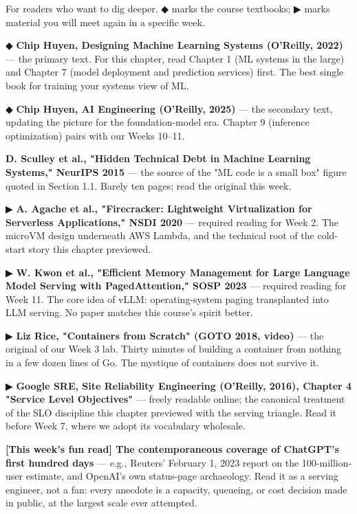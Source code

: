 For readers who want to dig deeper. ◆ marks the course textbooks; ▶ marks material you will meet again in a specific week.

\begin{tbbitemize}
  \item ◆ \textbf{Chip Huyen, Designing Machine Learning Systems (O'Reilly, 2022)} — the primary text. For this chapter, read Chapter 1 (ML systems in the large) and Chapter 7 (model deployment and prediction services) first. The best single book for training your systems view of ML.
  \item ◆ \textbf{Chip Huyen, AI Engineering (O'Reilly, 2025)} — the secondary text, updating the picture for the foundation-model era. Chapter 9 (inference optimization) pairs with our Weeks 10–11.
  \item \textbf{D. Sculley et al., "Hidden Technical Debt in Machine Learning Systems," NeurIPS 2015} — the source of the "ML code is a small box" figure quoted in Section 1.1. Barely ten pages; read the original this week.
  \item ▶ \textbf{A. Agache et al., "Firecracker: Lightweight Virtualization for Serverless Applications," NSDI 2020} — required reading for Week 2. The microVM design underneath AWS Lambda, and the technical root of the cold-start story this chapter previewed.
  \item ▶ \textbf{W. Kwon et al., "Efficient Memory Management for Large Language Model Serving with PagedAttention," SOSP 2023} — required reading for Week 11. The core idea of vLLM: operating-system paging transplanted into LLM serving. No paper matches this course's spirit better.
  \item ▶ \textbf{Liz Rice, "Containers from Scratch" (GOTO 2018, video)} — the original of our Week 3 lab. Thirty minutes of building a container from nothing in a few dozen lines of Go. The mystique of containers does not survive it.
  \item ▶ \textbf{Google SRE, Site Reliability Engineering (O'Reilly, 2016), Chapter 4 "Service Level Objectives"} — freely readable online; the canonical treatment of the SLO discipline this chapter previewed with the serving triangle. Read it before Week 7, where we adopt its vocabulary wholesale.
  \item \textbf{[This week's fun read] The contemporaneous coverage of ChatGPT's first hundred days} — e.g., Reuters' February 1, 2023 report on the 100-million-user estimate, and OpenAI's own status-page archaeology. Read it as a serving engineer, not a fan: every anecdote is a capacity, queueing, or cost decision made in public, at the largest scale ever attempted.

\end{tbbitemize}
